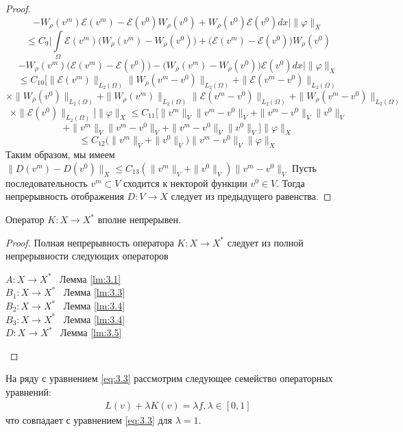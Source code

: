 \begin{proof}
    $$-W_{\rho}(v^m)\mathcal{E}(v^m)-\mathcal{E}(v^0)W_{\rho}(v^0)+W_{\rho}(v^0)\mathcal{E}(v^0)dx\bigg|\|\varphi\|_X$$
    $$\leqslant C_9\bigg|\int\limits_{\Omega}\mathcal{E}(v^m)\bigg(W_{\rho}(v^m)-W_{\rho}(v^0)\bigg)+\bigg(\mathcal{E}(v^m)-\mathcal{E}(v^0)\bigg)W_{\rho}(v^0)$$
    $$-W_{\rho}(v^m)\bigg(\mathcal{E}(v^m)-\mathcal{E}(v^0)\bigg)-\bigg(W_{\rho}(v^m)-W_{\rho}(v^0)\bigg)\mathcal{E}(v^0)dx\bigg|\|\varphi\|_X$$
    $$\leqslant C_{10}\bigg[\|\mathcal{E}(v^m)\|_{L_2(\Omega)}\|W_{\rho}(v^m-v^0)\|_{L_2(\Omega)}+\|\mathcal{E}(v^m-v^0)\|_{L_2(\Omega)}$$
    $$\times\|W_{\rho}(v^0)\|_{L_2(\Omega)}+\|W_{\rho}(v^m)\|_{L_2(\Omega)}\|\mathcal{E}(v^m-v^0)\|_{L_2(\Omega)}+\|W_{\rho}(v^m-v^0)\|_{L_2(\Omega)}$$
    $$\times\|\mathcal{E}(v^0)\|_{L_2(\Omega)}\bigg]\|\varphi\|_X\leqslant C_{11}\bigg[\|v^m\|_V\|v^m-v^0\|_V+\|v^m-v^0\|_V\|v^0\|_V$$
    $$+\|v^m\|_V\|v^m-v^0\|_V+\|v^m-v^0\|_V\|v^0\|_V\bigg]\|\varphi\|_X$$
    $$\leqslant C_{12}\bigg(\|v^m\|_V+\|v^0\|_V\bigg)\|v^m-v^0\|_V\|\varphi\|_X$$
    Таким образом, мы имеем $\|D(v^m)-D(v^0)\|_X\leqslant C_{13}(\|v^m\|_V+\|v^0\|_V)\|v^m-v^0\|_V$
    Пусть последовательность ${v^m}\subset V$ сходится к некторой функции $v^0\in V$. Тогда непрерывность отображения $D:V\rightarrow X$
    следует из предыдущего равенства.
\end{proof}

\begin{lemma}\label{lm:3.6}
    Оператор $K:X\rightarrow X^*$ вполне непрерывен.
\end{lemma}

\begin{proof}
    Полная непрерывность оператора $K:X\rightarrow X^*$ следует из полной непрерывности следующих операторов
    \begin{center}
        $A:X\rightarrow X^*$ \ Лемма \ref{lm:3.1} \\
        $B_1:X\rightarrow X^*$ \ Лемма \ref{lm:3.3} \\
        $B_2:X\rightarrow X^*$ \ Лемма \ref{lm:3.4} \\
        $B_3:X\rightarrow X^*$ \ Лемма \ref{lm:3.4} \\
        $D:X\rightarrow X^*$ \ Лемма \ref{lm:3.5} \\
    \end{center}
\end{proof}

На ряду с уравнением \ref{eq:3.3} рассмотрим следующее семейство операторных уравнений:
\begin{equation}\label{eq:3.5}
    \begin{gathered}
    L(v)+\lambda K(v)=\lambda f, \lambda\in [0,1]
    \end{gathered}
\end{equation}
что совпадает с уравнением \ref{eq:3.3} для $\lambda=1$.


